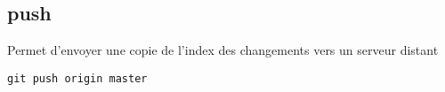 \subsection*{push}
Permet d'envoyer une copie de l'index des changements vers un serveur distant
\begin{verbatim}
git push origin master
\end{verbatim}


